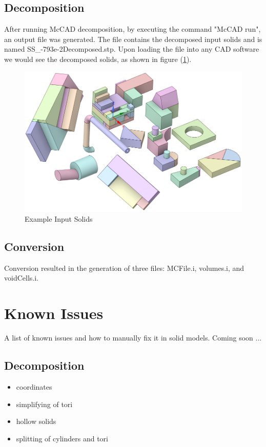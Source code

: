 \documentclass[letterpaper, 12 pt]{report}
\begin{document}
  \subsection{Decomposition}
    After running McCAD decomposition, by executing the command "McCAD run", an output file was generated. The file contains the decomposed input solids and is named SS\_-793e-2Decomposed.stp. Upon loading the file into any CAD software we would see the decomposed solids, as shown in figure (\ref{fig:DecomposedSolids}).
    \begin{figure}[h]
    	\centering
    	\includegraphics[scale=0.5]{figures/decomposedSolids.png}
    	\caption{Example Input Solids}
    	\label{fig:DecomposedSolids}
    \end{figure}

  \subsection{Conversion}
    Conversion resulted in the generation of three files: MCFile.i, volumes.i, and voidCells.i.


\section{Known Issues}
A list of known issues and how to manually fix it in solid models. Coming soon ...
\subsection{Decomposition}
\begin{itemize}
	\item coordinates
	\item simplifying of tori
	\item hollow solids
	\item splitting of cylinders and tori
\end{itemize}
\end{document}
